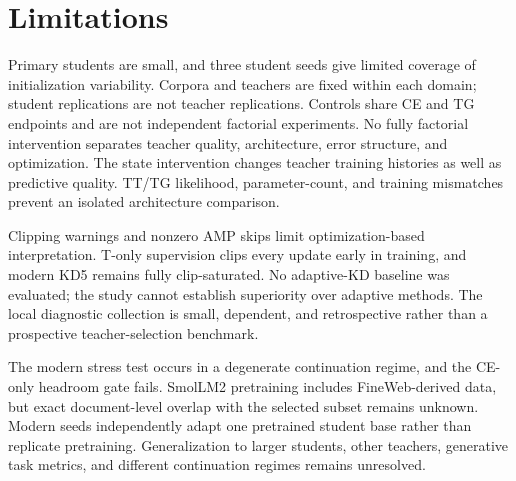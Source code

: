 \section*{Limitations}\label{sec:limitations}

Primary students are small, and three student seeds give limited coverage of initialization variability. Corpora and teachers are fixed within each domain; student replications are not teacher replications. Controls share CE and TG endpoints and are not independent factorial experiments. No fully factorial intervention separates teacher quality, architecture, error structure, and optimization. The state intervention changes teacher training histories as well as predictive quality. TT/TG likelihood, parameter-count, and training mismatches prevent an isolated architecture comparison.

Clipping warnings and nonzero AMP skips limit optimization-based interpretation. T-only supervision clips every update early in training, and modern KD5 remains fully clip-saturated. No adaptive-KD baseline was evaluated; the study cannot establish superiority over adaptive methods. The local diagnostic collection is small, dependent, and retrospective rather than a prospective teacher-selection benchmark.

The modern stress test occurs in a degenerate continuation regime, and the CE-only headroom gate fails. SmolLM2 pretraining includes FineWeb-derived data, but exact document-level overlap with the selected subset remains unknown. Modern seeds independently adapt one pretrained student base rather than replicate pretraining. Generalization to larger students, other teachers, generative task metrics, and different continuation regimes remains unresolved.
